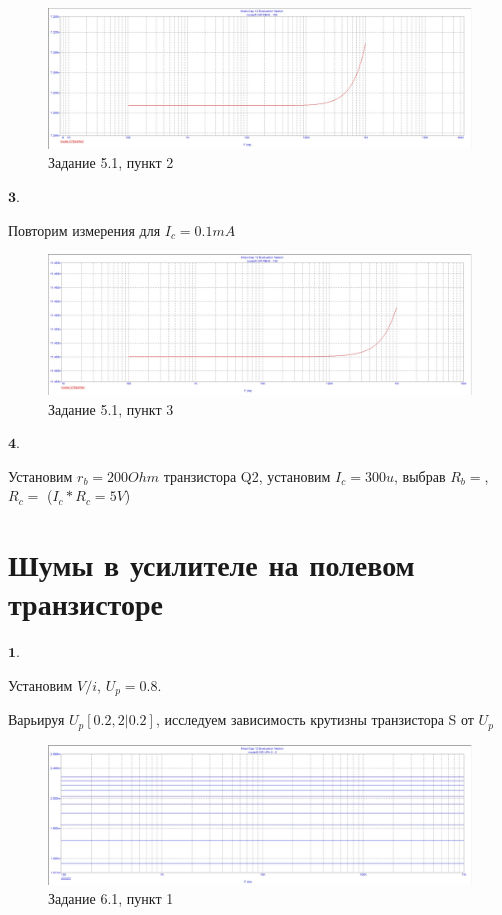 \documentclass[a4paper, 14pt]{extarticle}%
\begin{document}
\begin{figure}[h!]
			\centering
			\includegraphics[width=1.1\linewidth]{5/5_1_3.jpg}
			\caption{Задание 5.1, пункт 2}
			\label{A}
\end{figure}

$\textbf{3.}$


Повторим измерения для $I_c = 0.1mA$

\begin{figure}[h!]
			\centering
			\includegraphics[width=1.1\linewidth]{5/5_1_4.jpg}
			\caption{Задание 5.1, пункт 3}
			\label{A}
\end{figure}


$\textbf{4.}$


Установим $r_b = 200Ohm$ транзистора Q2, установим $I_c = 300u$, выбрав $R_b = $, $R_c = $ ($I_c*R_c = 5V$)

\section{Шумы в усилителе на полевом транзисторе}

$\textbf{1.}$


Установим ${V/i}$, $U_p = 0.8$. %

Варьируя $U_p[0.2,2|0.2]$, исследуем зависимость крутизны транзистора S от $U_p$

\begin{figure}[h!]
			\centering
			\includegraphics[width=1.1\linewidth]{6/6_1_1.jpg}
			\caption{Задание 6.1, пункт 1}
			\label{A}
\end{figure}
\end{document}
